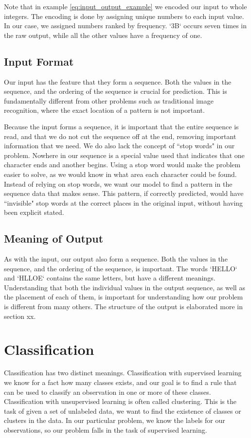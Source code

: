 Note that in example \ref{eq:input_output_example} we encoded our input to whole integers. The encoding is done by assigning unique numbers to each input value. In our case, we assigned numbers ranked by frequency. `3B` occurs seven times in the raw output, while all the other values have a frequency of one.

\subsection{Input Format}
Our input has the feature that they form a sequence. Both the values in the sequence, and the ordering of the sequence is crucial for prediction. This is fundamentally different from other problems such as traditional image recognition, where the exact location of a pattern is not important.

Because the input forms a sequence, it is important that the entire sequence is read, and that we do not cut the sequence off at the end, removing important information that we need. We do also lack the concept of ``stop words" in our problem. Nowhere in our sequence is a special value used that indicates that one character ends and another begins. Using a stop word would make the problem easier to solve, as we would know in what area each character could be found. Instead of relying on stop words, we want our model to find a pattern in the sequence data that makes sense. This pattern, if correctly predicted, would have ``invisible" stop words at the correct places in the original input, without having been explicit stated.


\subsection{Meaning of Output}
As with the input, our output also form a sequence. Both the values in the sequence, and the ordering of the sequence, is important. The words `HELLO` and `HLLOE` contains the same letters, but have a different meanings. Understanding that both the individual values in the output sequence, as well as the placement of each of them, is important for understanding how our problem is different from many others. The structure of the output is elaborated more in section xx.


\section{Classification}
\label{sec:classification_explanation}
Classification has two distinct meanings. Classification with supervised learning we know for a fact how many classes exists, and our goal is to find a rule that can be used to classify an observation in one or more of these classes. Classification with unsupervised learning is often called clustering. This is the task of given a set of unlabeled data, we want to find the existence of classes or clusters in the data. In our particular problem, we know the labels for our observations, so our problem falls in the task of supervised learning.

